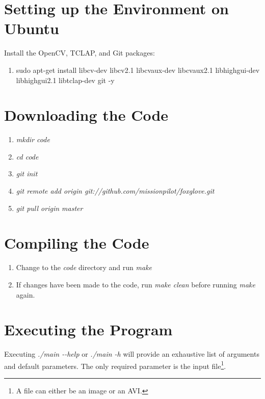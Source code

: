 \documentclass{article}
\begin{document}
\section{Setting up the Environment on Ubuntu}
Install the OpenCV, TCLAP, and Git packages:
\begin{enumerate}
\item
sudo apt-get install 
    libcv-dev
    libcv2.1
    libcvaux-dev
    libcvaux2.1
    libhighgui-dev
    libhighgui2.1
    libtclap-dev
    git -y
\end{enumerate}

\section{Downloading the Code}
\begin{enumerate}
\item \emph{mkdir code}
\item \emph{cd code}
\item \emph{git init}
\item \emph{git remote add origin git://github.com/missionpilot/foxglove.git}
\item \emph{git pull origin master}
\end{enumerate}

\section{Compiling the Code}
\begin{enumerate}
\item Change to the \emph{code} directory and run \emph{make}
\item If changes have been made to the code, run \emph{make clean}
      before running \emph{make} again.
\end{enumerate}

\section{Executing the Program}
Executing \emph{./main -{}-help} or \emph{./main -h} will provide an exhaustive
list of arguments and default parameters. The only required parameter is the
input file\footnote{A file can either be an image or an AVI.}.
\end{document}
